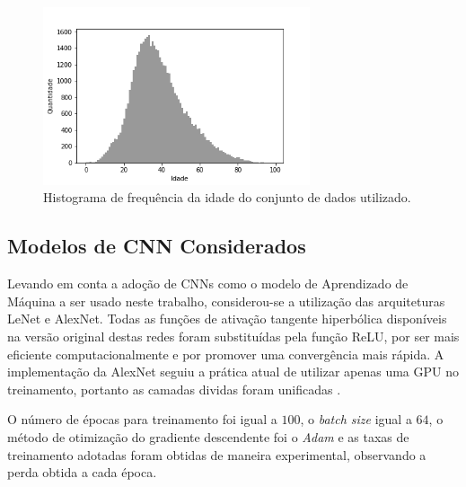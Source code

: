 \begin{figure}
    \centering
     \includegraphics[width=0.7\textwidth]{img/idade_hist_clean}
     \caption{Histograma de frequência da idade do conjunto de dados utilizado.}
     \label{fig:hist}
\end{figure}

\subsection{Modelos de CNN Considerados}

Levando em conta a adoção de CNNs como o modelo de Aprendizado de Máquina a ser usado neste trabalho, considerou-se a utilização das arquiteturas LeNet e AlexNet. Todas as funções de ativação tangente hiperbólica disponíveis na versão original destas redes foram substituídas pela função ReLU, por ser mais eficiente computacionalmente e por promover uma convergência mais rápida. A implementação da AlexNet seguiu a prática atual de utilizar apenas uma GPU no treinamento, portanto as camadas dividas foram unificadas \cite{tensorflow:alexnet}.

O número de épocas para treinamento foi igual a $100$, o \emph{batch size} igual a $64$, o método de otimização do gradiente descendente foi o \emph{Adam} e as taxas de treinamento adotadas foram obtidas de maneira experimental, observando a perda obtida a cada época.
